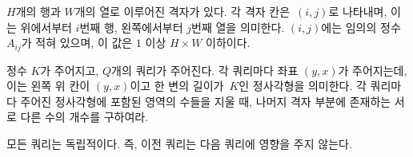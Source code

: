 $H$개의 행과 $W$개의 열로 이루어진 격자가 있다. 각 격자 칸은 $(i, j)$로 나타내며, 이는 위에서부터 $i$번째 행, 왼쪽에서부터 $j$번째 열을 의미한다. $(i, j)$에는 임의의 정수 $A_{ij}$가 적혀 있으며, 이 값은 $1$ 이상 $H \times W$ 이하이다.

정수 $K$가 주어지고, $Q$개의 쿼리가 주어진다. 각 쿼리마다 좌표 $(y, x)$가 주어지는데, 이는 왼쪽 위 칸이 $(y, x)$이고 한 변의 길이가 $K$인 정사각형을 의미한다. 각 쿼리마다 주어진 정사각형에 포함된 영역의 수들을 지울 때, 나머지 격자 부분에 존재하는 서로 다른 수의 개수를 구하여라.

모든 쿼리는 독립적이다. 즉, 이전 쿼리는 다음 쿼리에 영향을 주지 않는다.